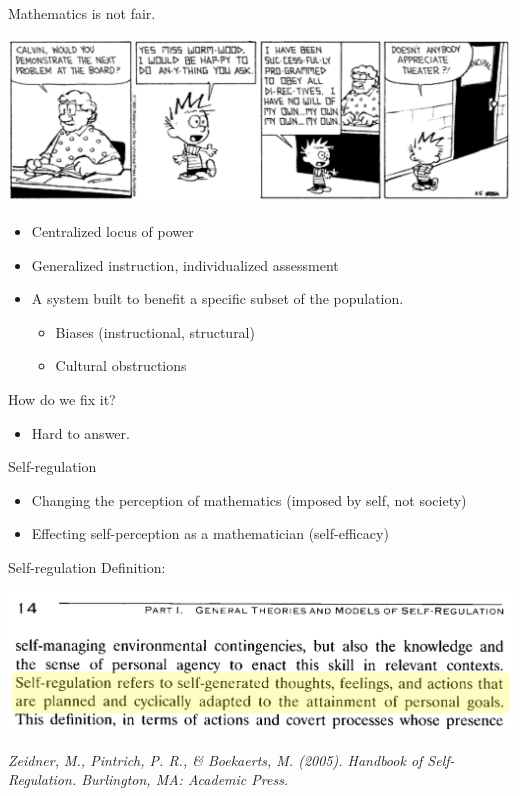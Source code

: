 \documentclass{beamer}
\begin{document}
\begin{frame}{Mathematics is not fair.}

    \includegraphics[width=\textwidth]{ch3}

  \begin{itemize}
  \item Centralized locus of power\pause
  \item Generalized instruction, individualized assessment\pause
  \item A system built to benefit a specific subset of the population.
  \begin{itemize}
    \item Biases (instructional, structural)
    \item Cultural obstructions
  \end{itemize}
  \end{itemize}
\end{frame}
\begin{frame}
  How do we fix it?
  \begin{itemize}
    \item Hard to answer.
  \end{itemize}
\end{frame}
\begin{frame}{Self-regulation}
  \begin{itemize}
    \item Changing the perception of mathematics (imposed by self, not society)
    \item Effecting self-perception as a mathematician (self-efficacy)
  \end{itemize}
\end{frame}
\begin{frame}{Self-regulation}
  Definition:
  \begin{center}
    \includegraphics[scale=0.4]{selfregdef}
  \end{center}
  \hfill \begin{minipage}[]{7cm}
      \emph{\tiny Zeidner, M., Pintrich, P. R., \& Boekaerts, M. (2005). Handbook of Self-Regulation. Burlington, MA: Academic Press.}
\end{minipage}
\end{frame}
\end{document}
